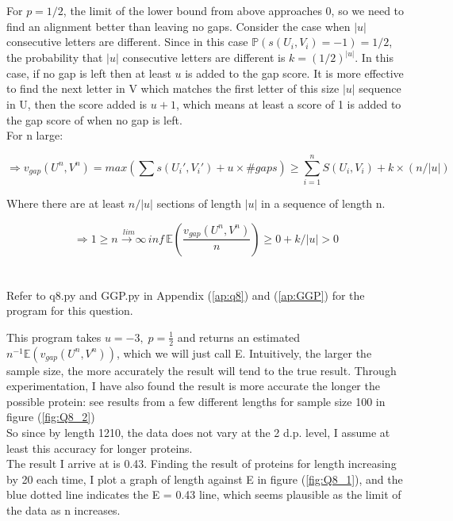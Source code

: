 \documentclass{article}
\begin{document}
	For $ p = 1/2 $, the limit of the lower bound from above approaches 0, so we need to find an alignment better than leaving no gaps. Consider the case when $ |u| $ consecutive letters are different. Since in this case $ \mathbb{P}(s(U_i, V_i) = -1) = 1/2 $, the probability that $ |u| $ consecutive letters are different is $ k = (1/2)^{|u|} $. In this case, if no gap is left then at least $ u $ is added to the gap score. It is more effective to find the next letter in V which matches the first letter of this size $ |u| $ sequence in U, then the score added is $ u + 1 $, which means at least a score of 1 is added to the gap score of when no gap is left.\\
	For n large:
	
	\[\Rightarrow v_{gap}(U^n, V^n) = max(\sum s(U_i', V_i') + u \times \# gaps) \geq \sum_{i = 1}^{n} S(U_i, V_i) + k \times (n/|u|)\]
	
	Where there are at least $ n/|u| $ sections of length $ |u| $ in a sequence of length n.
	
	\[\Rightarrow 1 \geq \stackrel{lim}{n \rightarrow \infty} \, inf \, \mathbb{E} (\frac{v_{gap}(U^n, V^n)}{n}) \geq 0 + k/|u| > 0\]
	
	
	
	\section{}
	Refer to q8.py and GGP.py in Appendix (\ref{ap:q8}) and (\ref{ap:GGP}) for the program for this question.
	
	This program takes $ u = -3, \; p = \frac{1}{2} $ and returns an estimated $ n^{-1} \mathbb{E}(v_{gap}(U^n, V^n)) $, which we will just call E.
	Intuitively, the larger the sample size, the more accurately the result will tend to the true result.
	Through experimentation, I have also found the result is more accurate the longer the possible protein: see results from a few different lengths for sample size 100 in figure (\ref{fig:Q8_2})\\
	So since by length 1210, the data does not vary at the 2 d.p. level, I assume at least this accuracy for longer proteins.\\
	The result I arrive at is 0.43.
	Finding the result of proteins for length increasing by 20 each time, I plot a graph of length against E in figure (\ref{fig:Q8_1}), and the blue dotted line indicates the E = 0.43 line, which seems plausible as the limit of the data as n increases.
	
\end{document}
